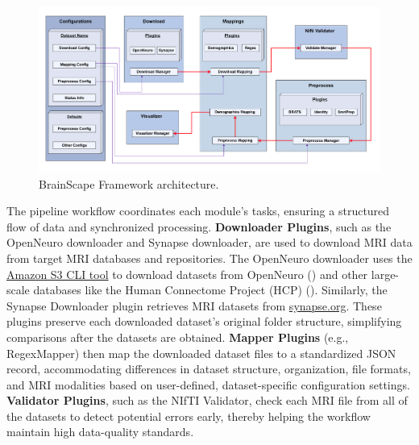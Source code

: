 \begin{figure}[htbp]\begin{center}\includegraphics[width=\linewidth]{figures/architecture.png}
    \caption{
        BrainScape Framework architecture.
    }
    \label{fig:SystemArchitecture}\end{center}
\end{figure}

The pipeline workflow coordinates each module's tasks, ensuring a structured flow of data and synchronized processing. 
\textbf{Downloader Plugins}, such as the OpenNeuro downloader and Synapse downloader, are used to download MRI 
data from target MRI databases and repositories.
The OpenNeuro downloader uses the \href{https://docs.aws.amazon.com/cli/latest/reference/s3/}{Amazon S3 CLI tool} to download datasets 
from OpenNeuro (\cite{markiewicz2021openneuro}) and other large-scale databases like the Human Connectome Project (HCP) (\cite{van2013wu}).
Similarly, the Synapse Downloader plugin retrieves MRI datasets from \href{https://www.synapse.org}{synapse.org}.
These plugins preserve each downloaded dataset's original folder structure, simplifying comparisons after the datasets are obtained.
\textbf{Mapper Plugins} (e.g., RegexMapper) then map the downloaded dataset files to a standardized JSON record, 
accommodating differences in dataset structure, organization, file formats, and MRI modalities based on user-defined, 
dataset-specific configuration settings.
\textbf{Validator Plugins}, such as the NIfTI Validator, check each MRI file from all of the datasets 
to detect potential errors early, thereby helping the workflow maintain high data-quality standards.

